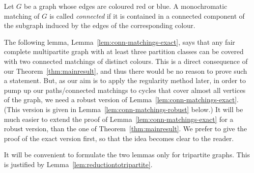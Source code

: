 \documentclass[a4paper,10pt]{article}
\begin{document}
Let $G$ be a graph whose edges are coloured red or blue.
A monochromatic matching of $G$ is called \emph{connected} if it is contained in a connected component of the subgraph induced by the edges of the corresponding colour. 

The following lemma, Lemma~\ref{lem:conn-matchings-exact}, says that any fair complete multipartite graph with at least three partition classes can be covered with two connected matchings of distinct colours. This is a direct consequence of our Theorem~\ref{thm:mainresult}, and thus there would be no reason to prove such a statement. But, as our aim is to apply the regularity method later, in order to pump up our paths/connected matchings to cycles that cover almost all vertices of the graph, we need a robust version of Lemma~\ref{lem:conn-matchings-exact}. (This version is given in Lemma~\ref{lem:conn-matchings-robust} below.) It will be much easier to extend the proof of Lemma~\ref{lem:conn-matchings-exact} for a robust version, than the one of Theorem~\ref{thm:mainresult}. We prefer to give the proof of the exact version first, so that the idea becomes clear to the reader. 

It will be convenient to formulate the two lemmas only for tripartite graphs. This is justified by Lemma~\ref{lem:reductiontotripartite}.
\end{document}
